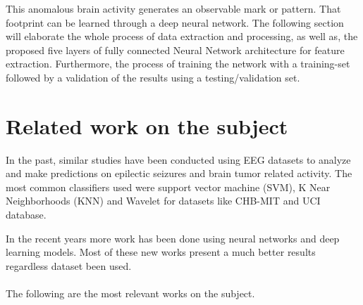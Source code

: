 \documentclass{llncs}       %
\begin{document}
This anomalous brain activity generates an observable mark or pattern. That footprint can be learned through a deep neural network. The following section will elaborate the whole process of data extraction and processing, as well as, the proposed five layers of fully connected Neural Network architecture for feature extraction. Furthermore, the process of training the network with a training-set followed by a validation of the results using a testing/validation set. 

\paragraph{}\paragraph{}

\section{Related work on the subject}
\label{sec:1}

 In the past, similar studies have been conducted using EEG datasets to analyze and make predictions on epilectic seizures and brain tumor related activity. The most common classifiers used were support vector machine (SVM), K Near Neighborhoods (KNN) and Wavelet for datasets like CHB-MIT and UCI database. 

In the recent years more work has been done using neural networks and deep learning models.  Most of these new works present a much better results regardless dataset been used.

\paragraph{}
The following are the most relevant works on the subject.
\end{document}
